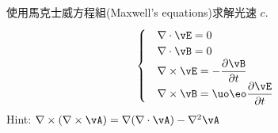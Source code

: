 \begin{problem}
使用馬克士威方程組(Maxwell's equations)求解光速 $c$.
$$
    \begin{cases}
         & \nabla \cdot \vE = 0                                       \\
         & \nabla \cdot \vB = 0                                       \\
         & \nabla \times \vE = -\dfrac{\partial\vB}{\partial t}       \\
         & \nabla \times \vB = \uo\eo\dfrac{\partial \vE}{\partial t}
    \end{cases}
$$
Hint: $\nabla \times (\nabla \times \vA) = \nabla(\nabla \cdot \vA) - \nabla^2\vA$
\end{problem}

\begin{solve}
\end{solve}